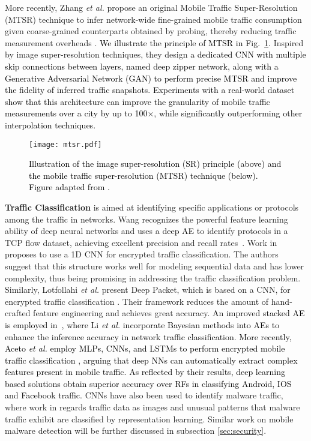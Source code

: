 \documentclass[journal,comsoc,letter]{IEEEtran}
\newcommand{\edit}[1]{\textcolor{black}{#1}}
\newcommand{\rev}[1]{\textcolor{black}{#1}}
\begin{document}
More recently, Zhang \emph{et al.} propose an original Mobile Traffic Super-Resolution (MTSR) technique to infer network-wide fine-grained mobile traffic consumption given coarse-grained counterparts obtained by probing, thereby reducing traffic measurement overheads \cite{chaoyun2017zipnet}. \rev{We illustrate the principle of MTSR in Fig.~\ref{fig:mtsr}.} Inspired by image super-resolution techniques, they design \edit{a dedicated CNN with multiple skip connections between layers, named deep zipper network, along with a Generative Adversarial Network (GAN) to perform precise MTSR and improve the fidelity of inferred traffic snapshots. Experiments with a real-world dataset show that this architecture can improve the granularity of mobile traffic measurements over a city by up to 100$\times$, while significantly outperforming other interpolation techniques.}\\
\begin{figure}[htb]
\begin{center}
\texttt{[image: mtsr.pdf]}
\end{center}
\caption{\label{fig:mtsr} \rev{Illustration of the image super-resolution (SR) principle (above) and the mobile traffic super-resolution (MTSR) technique (below). Figure adapted from \cite{chaoyun2017zipnet}.} }
\end{figure}

\noindent \textbf{Traffic Classification}
is aimed at identifying specific applications or protocols among the traffic in networks. Wang recognizes the powerful feature learning ability of deep neural networks and uses \rev{a deep AE} to identify protocols in a TCP flow dataset, achieving excellent precision and recall rates~\cite{wang2015applications}. Work in~\cite{wang2017end} proposes to use a 1D CNN for encrypted traffic classification. The authors suggest that this structure works well for modeling sequential data and has lower complexity, thus being promising in addressing the traffic classification problem. Similarly, Lotfollahi \emph{et al.} present Deep Packet, which is based on a CNN, for encrypted traffic classification \cite{lotfollahi2017deep}. Their framework reduces the amount of hand-crafted feature engineering and achieves great accuracy. \rev{An improved stacked AE is employed in~\cite{8553650}, where Li \emph{et al.} incorporate Bayesian methods into AEs to enhance the inference accuracy in network traffic classification.} \edit{More recently, Aceto \emph{et al.} employ MLPs, CNNs, and LSTMs to perform encrypted mobile traffic classification \cite{aceto2018mobile}, arguing that deep NNs can automatically extract complex features present in mobile traffic. As reflected by their results, deep learning based solutions obtain superior accuracy over RFs in classifying Android, IOS and Facebook traffic.}
CNNs have also been used to identify malware traffic, where work in \cite{wang2017malware} regards traffic data as images and unusual patterns that malware traffic exhibit are classified by representation learning. Similar work on mobile malware detection will be further discussed in subsection \ref{sec:security}. 
\\
\end{document}
